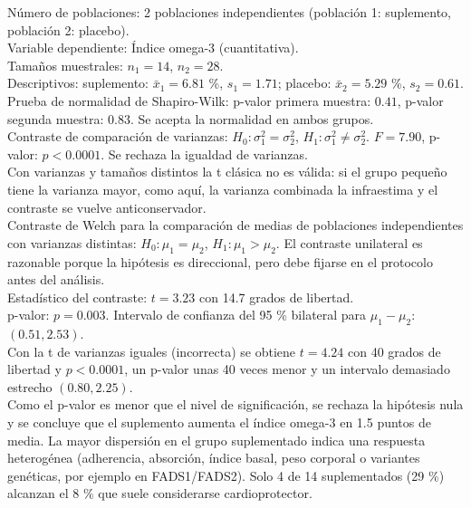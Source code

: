 \documentclass[
  spanish,
  a4paper,
]{scrreport}
\theoremstyle{definition}
\theoremstyle{remark}
\begin{document}
\begin{tcolorbox}[enhanced jigsaw, arc=.35mm, bottomrule=.15mm, bottomtitle=1mm, breakable, colback=white, colbacktitle=quarto-callout-tip-color!10!white, colframe=quarto-callout-tip-color-frame, coltitle=black, left=2mm, leftrule=.75mm, opacityback=0, opacitybacktitle=0.6, rightrule=.15mm, title=\textcolor{quarto-callout-tip-color}{\faLightbulb}\hspace{0.5em}{Solución}, titlerule=0mm, toprule=.15mm, toptitle=1mm]

Número de poblaciones: 2 poblaciones independientes (población 1:
suplemento, población 2: placebo).\\
Variable dependiente: Índice omega-3 (cuantitativa).\\
Tamaños muestrales: \(n_1=14\), \(n_2=28\).\\
Descriptivos: suplemento: \(\bar x_1=6.81\) \%, \(s_1=1.71\); placebo:
\(\bar x_2=5.29\) \%, \(s_2=0.61\).\\
Prueba de normalidad de Shapiro-Wilk: p-valor primera muestra: \(0.41\),
p-valor segunda muestra: \(0.83\). Se acepta la normalidad en ambos
grupos.\\
Contraste de comparación de varianzas: \(H_0:\sigma_1^2=\sigma_2^2\),
\(H_1:\sigma_1^2\neq \sigma_2^2\). \(F=7.90\), p-valor: \(p<0.0001\). Se
rechaza la igualdad de varianzas.\\
Con varianzas y tamaños distintos la t clásica no es válida: si el grupo
pequeño tiene la varianza mayor, como aquí, la varianza combinada la
infraestima y el contraste se vuelve anticonservador.\\
Contraste de Welch para la comparación de medias de poblaciones
independientes con varianzas distintas: \(H_0:\mu_1=\mu_2\),
\(H_1:\mu_1>\mu_2\). El contraste unilateral es razonable porque la
hipótesis es direccional, pero debe fijarse en el protocolo antes del
análisis.\\
Estadístico del contraste: \(t=3.23\) con 14.7 grados de libertad.\\
p-valor: \(p=0.003\). Intervalo de confianza del 95 \% bilateral para
\(\mu_1-\mu_2\): \((0.51, 2.53)\).\\
Con la t de varianzas iguales (incorrecta) se obtiene \(t=4.24\) con 40
grados de libertad y \(p<0.0001\), un p-valor unas 40 veces menor y un
intervalo demasiado estrecho \((0.80, 2.25)\).\\
Como el p-valor es menor que el nivel de significación, se rechaza la
hipótesis nula y se concluye que el suplemento aumenta el índice omega-3
en 1.5 puntos de media. La mayor dispersión en el grupo suplementado
indica una respuesta heterogénea (adherencia, absorción, índice basal,
peso corporal o variantes genéticas, por ejemplo en FADS1/FADS2). Solo 4
de 14 suplementados (29 \%) alcanzan el 8 \% que suele considerarse
cardioprotector.

\end{tcolorbox}
\end{document}
